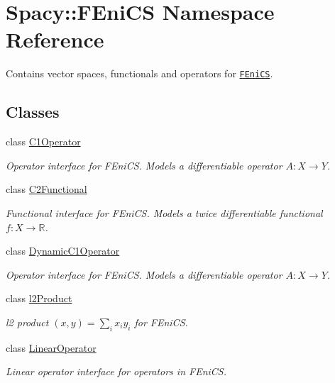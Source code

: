 \hypertarget{namespaceSpacy_1_1FEniCS}{}\section{Spacy\+:\+:F\+Eni\+C\+S Namespace Reference}
\label{namespaceSpacy_1_1FEniCS}


Contains vector spaces, functionals and operators for \href{www.fenicsproject.org}{\tt F\+Eni\+C\+S}.  


\subsection*{Classes}
\begin{DoxyCompactItemize}
\item 
class \hyperlink{classSpacy_1_1FEniCS_1_1C1Operator}{C1\+Operator}
\begin{DoxyCompactList}\small\item\em Operator interface for F\+Eni\+C\+S. Models a differentiable operator $A:X\rightarrow Y$. \end{DoxyCompactList}\item 
class \hyperlink{classSpacy_1_1FEniCS_1_1C2Functional}{C2\+Functional}
\begin{DoxyCompactList}\small\item\em Functional interface for F\+Eni\+C\+S. Models a twice differentiable functional $f:X\rightarrow \mathbb{R}$. \end{DoxyCompactList}\item 
class \hyperlink{classSpacy_1_1FEniCS_1_1DynamicC1Operator}{Dynamic\+C1\+Operator}
\begin{DoxyCompactList}\small\item\em Operator interface for F\+Eni\+C\+S. Models a differentiable operator $A:X\rightarrow Y$. \end{DoxyCompactList}\item 
class \hyperlink{classSpacy_1_1FEniCS_1_1l2Product}{l2\+Product}
\begin{DoxyCompactList}\small\item\em l2 product $(x,y) = \sum_i x_i y_i $ for F\+Eni\+C\+S. \end{DoxyCompactList}\item 
class \hyperlink{classSpacy_1_1FEniCS_1_1LinearOperator}{Linear\+Operator}
\begin{DoxyCompactList}\small\item\em Linear operator interface for operators in F\+Eni\+C\+S. \end{DoxyCompactList}\item 

\end{DoxyCompactItemize}
